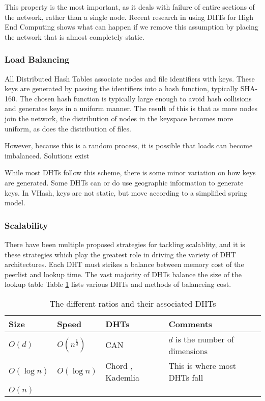 \documentclass[10pt,letterpaper]{report}
\begin{document}
This property is the most important, as it deals with failure of entire sections of the network, rather than a single node.
Recent research in using DHTs for High End Computing \cite{li2013zht} shows what can happen if we remove this assumption by placing the network that is almost completely static.



\subsubsection{Load Balancing}
All Distributed Hash Tables associate nodes and file identifiers with keys.  
These keys are generated by passing the identifiers into a hash function, typically SHA-160.
The chosen hash function is typically large enough to avoid hash collisions and generates keys in a uniform manner. 
The result of this is that as more nodes join the network, the distribution of nodes in the keyspace becomes more uniform, as does the distribution of files.

However, because this is a random process, it is possible that loads can become imbalanced.
Solutions exist \cite{}%


While most DHTs follow this scheme, there is some minor variation on how keys are generated.
Some DHTs can or do use geographic information to generate keys.
In VHash, keys are not static, but move according to a simplified spring model.

\subsubsection{Scalability}
There have been multiple proposed strategies for tackling scalablity, and it is these strategies which play the greatest role in driving the variety of DHT architectures. 
Each DHT must strikes a balance between memory cost of the peerlist and lookup time. 
The vast majority of DHTs balance the size of the lookup table
Table \ref{tab:tradeoffs} lists various DHTs and methods of balanceing cost.


\begin{table}
    \centering
    \begin{tabular}{|l|l|l|l|}
    \hline
    Size & Speed & DHTs & Comments \\ \hline
    $O(d)$ & $O(n^{\frac{1}{d}})$ & CAN \cite{can} & $d$ is the number of dimensions \\ \hline
    $O(\log n)$ & $O(\log n)$ & Chord \cite{chord}, Kademlia \cite{kademlia} & This is where most DHTs fall \\ \hline
    $O(n)$ &  & & \\ \hline
    \end{tabular}
    \caption{The different ratios and their associated DHTs}
    \label{tab:tradeoffs}
\end{table}
\end{document}
